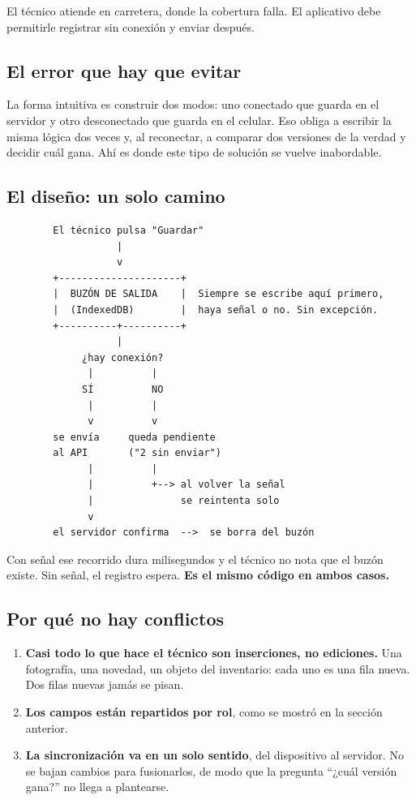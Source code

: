 El técnico atiende en carretera, donde la cobertura falla. El aplicativo debe
permitirle registrar sin conexión y enviar después.

\subsection{El error que hay que evitar}

La forma intuitiva es construir dos modos: uno conectado que guarda en el servidor
y otro desconectado que guarda en el celular. Eso obliga a escribir la misma
lógica dos veces y, al reconectar, a comparar dos versiones de la verdad y decidir
cuál gana. Ahí es donde este tipo de solución se vuelve inabordable.

\subsection{El diseño: un solo camino}

\begin{verbatim}
        El técnico pulsa "Guardar"
                   |
                   v
        +---------------------+
        |  BUZÓN DE SALIDA    |  Siempre se escribe aquí primero,
        |  (IndexedDB)        |  haya señal o no. Sin excepción.
        +----------+----------+
                   |
             ¿hay conexión?
              |          |
             SÍ          NO
              |          |
              v          v
        se envía     queda pendiente
        al API       ("2 sin enviar")
              |          |
              |          +--> al volver la señal
              |               se reintenta solo
              v
        el servidor confirma  -->  se borra del buzón
\end{verbatim}

Con señal ese recorrido dura milisegundos y el técnico no nota que el buzón
existe. Sin señal, el registro espera. \textbf{Es el mismo código en ambos casos.}

\subsection{Por qué no hay conflictos}

\begin{enumerate}
  \item \textbf{Casi todo lo que hace el técnico son inserciones, no ediciones.}
        Una fotografía, una novedad, un objeto del inventario: cada uno es una fila
        nueva. Dos filas nuevas jamás se pisan.
  \item \textbf{Los campos están repartidos por rol}, como se mostró en la sección
        anterior.
  \item \textbf{La sincronización va en un solo sentido}, del dispositivo al
        servidor. No se bajan cambios para fusionarlos, de modo que la pregunta
        ``¿cuál versión gana?'' no llega a plantearse.
\end{enumerate}

